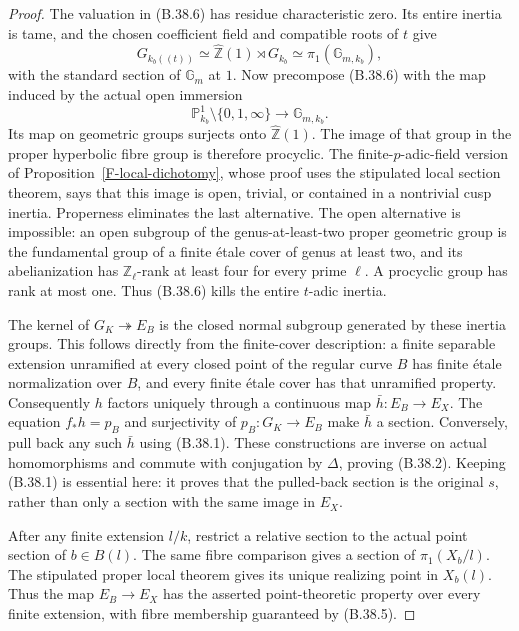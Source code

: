 \begin{proof}
The valuation in (B.38.6) has residue characteristic
zero. Its entire inertia is tame, and the chosen
coefficient field and compatible roots of $t$ give
\[
 G_{k_b((t))}\simeq
 \widehat{\mathbb Z}(1)\rtimes G_{k_b}
 \simeq\pi_1(\mathbb G_{m,k_b}),
 \tag{B.38.7}
\]
with the standard section of $\mathbb G_m$ at $1$.
Now precompose (B.38.6) with the map induced by the
actual open immersion
\[
 \mathbb P^1_{k_b}\setminus\{0,1,\infty\}
           \longrightarrow\mathbb G_{m,k_b}.
 \tag{B.38.8}
\]
Its map on geometric groups surjects onto
$\widehat{\mathbb Z}(1)$. The image of that group
in the proper hyperbolic fibre group is therefore
procyclic. The finite-$p$-adic-field version of
Proposition~\ref{F-local-dichotomy}, whose proof
uses the stipulated local section theorem, says
that this image is open, trivial, or contained in a
nontrivial cusp inertia. Properness eliminates the
last alternative. The open alternative is impossible:
an open subgroup of the genus-at-least-two proper
geometric group is the fundamental group of a finite
\'etale cover of genus at least two, and its
abelianization has $\mathbb Z_\ell$-rank at least
four for every prime $\ell$. A procyclic group has
rank at most one. Thus (B.38.6) kills the entire
$t$-adic inertia.

The kernel of $G_K\twoheadrightarrow E_B$ is the
closed normal subgroup generated by these inertia
groups. This follows directly from the finite-cover
description: a finite separable extension unramified
at every closed point of the regular curve $B$ has
finite \'etale normalization over $B$, and every
finite \'etale cover has that unramified property.
Consequently $h$ factors uniquely through a continuous
map $\bar h:E_B\to E_X$. The equation $f_*h=p_B$
and surjectivity of $p_B:G_K\to E_B$ make $\bar h$
a section. Conversely, pull back any such $\bar h$
using (B.38.1). These constructions are inverse on
actual homomorphisms and commute with conjugation by
$\Delta$, proving (B.38.2). Keeping (B.38.1) is
essential here: it proves that the pulled-back section
is the original $s$, rather than only a section with
the same image in $E_X$.

After any finite extension $l/k$, restrict a relative
section to the actual point section of $b\in B(l)$.
The same fibre comparison gives a section of
$\pi_1(X_b/l)$. The stipulated proper local theorem
gives its unique realizing point in $X_b(l)$. Thus
the map $E_B\to E_X$ has the asserted point-theoretic
property over every finite extension, with fibre
membership guaranteed by (B.38.5).


\end{proof}
